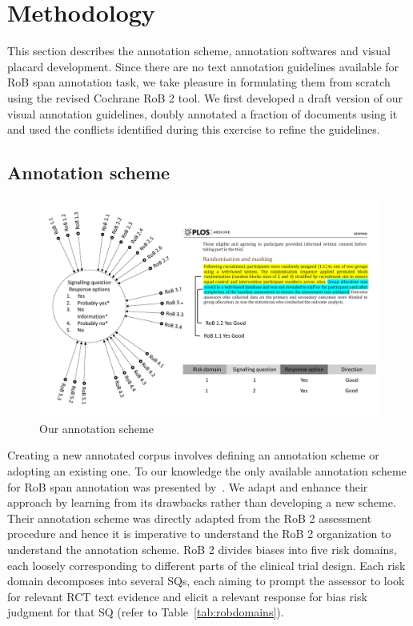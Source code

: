 \documentclass[sn-mathphys,Numbered]{sn-jnl}%
\theoremstyle{thmstyleone}%
\theoremstyle{thmstyletwo}%
\theoremstyle{thmstylethree}%
\begin{document}
\section{Methodology}
\label{sec:methods}
%
This section describes the annotation scheme, annotation softwares and visual placard development.
Since there are no text annotation guidelines available for RoB span annotation task, we take pleasure in formulating them from scratch using the revised Cochrane RoB 2 tool.
We first developed a draft version of our visual annotation guidelines, doubly annotated a fraction of documents using it and used the conflicts identified during this exercise to refine the guidelines.
%
%
%
\subsection{Annotation scheme}
\label{met:annot_scheme}
%

%
%
%
\begin{figure}
    \centering
    \includegraphics[width=0.99\columnwidth]{figures/annotation_schema.pdf}
    \caption{Our annotation scheme}
    \label{fig:annotationscheme}
\end{figure}
%
%
%



Creating a new annotated corpus involves defining an annotation scheme or adopting an existing one.
To our knowledge the only available annotation scheme for RoB span annotation was presented by~\cite{dhrangadhariya2023first}.
We adapt and enhance their approach by learning from its drawbacks rather than developing a new scheme.
Their annotation scheme was directly adapted from the RoB 2 assessment procedure and hence it is imperative to understand the RoB 2 organization to understand the annotation scheme.
RoB 2 divides biases into five risk domains, each loosely corresponding to different parts of the clinical trial design.
Each risk domain decomposes into several SQs, each aiming to prompt the assessor to look for relevant RCT text evidence and elicit a relevant response for bias risk judgment for that SQ (refer to Table~\ref{tab:robdomains}).
\end{document}
